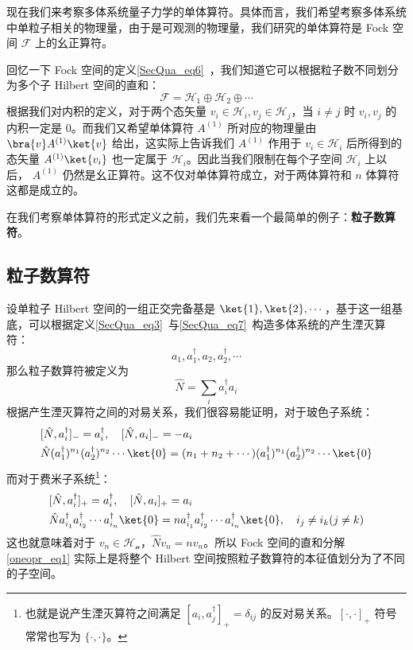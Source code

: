 

现在我们来考察多体系统量子力学的单体算符。具体而言，我们希望考察多体系统中单粒子相关的物理量，由于是可观测的物理量，我们研究的单体算符是 Fock 空间 $\mathcal{F}$ 上的幺正算符。

回忆一下 Fock 空间的定义\autoref{SecQua_eq6}~，我们知道它可以根据粒子数不同划分为多个子 Hilbert 空间的直和：
\begin{equation}\label{oneopr_eq1}
\mathcal{F}=\mathcal{H}_1\oplus \mathcal{H}_2\oplus \cdots
\end{equation}
根据我们对内积的定义，对于两个态矢量 $v_i\in \mathcal{H}_i, v_j\in \mathcal{H}_j$，当 $i\neq j$ 时 $v_i,v_j$ 的内积一定是 $0$。而我们又希望单体算符 $A^{(1)}$ 所对应的物理量由 $\bra{v}A^{(1)} \ket{v}$ 给出，这实际上告诉我们 $A^{(1)}$ 作用于 $v_i\in \mathcal{H}_i$ 后所得到的态矢量 $A^{(1)} \ket{v_i}$ 也一定属于 $\mathcal{H}_i$。因此当我们限制在每个子空间 $\mathcal{H}_i$ 上以后， $A^{(1)}$ 仍然是幺正算符。这不仅对单体算符成立，对于两体算符和 $n$ 体算符这都是成立的。

在我们考察单体算符的形式定义之前，我们先来看一个最简单的例子：\textbf{粒子数算符}。
\subsection{粒子数算符}
设单粒子 Hilbert 空间的一组正交完备基是 $\ket{1},\ket{2},\cdots$，基于这一组基底，可以根据定义\autoref{SecQua_eq3}~与\autoref{SecQua_eq7}~构造多体系统的产生湮灭算符：
\begin{equation}
a_1,a^\dagger_1,a_2,a^\dagger_2,\cdots
\end{equation}
那么粒子数算符被定义为
\begin{equation}\label{oneopr_eq2}
\hat N=\sum_i a_i^\dagger a_i
\end{equation}
根据产生湮灭算符之间的对易关系，我们很容易能证明，对于玻色子系统：
\begin{equation}
\begin{aligned}
&[\hat N,a_i^\dagger]_-=a_i^\dagger,\quad [\hat N,a_i]_-=-a_i\\
&\hat N (a_1^\dagger)^{n_1} (a_2^\dagger)^{n_2}\cdots \ket{0} = (n_1+n_2+\cdots)   (a_1^\dagger)^{n_1} (a_2^\dagger)^{n_2}\cdots \ket{0} 
\end{aligned}
\end{equation}
而对于费米子系统\footnote{也就是说产生湮灭算符之间满足 $[a_i,a_j^\dagger]_+=\delta_{ij}$ 的反对易关系。$[\cdot,\cdot]_+$ 符号常常也写为 $\{\cdot,\cdot\}$。}：
\begin{equation}
\begin{aligned}
&[\hat N,a_i^\dagger]_+=a_i^\dagger,\quad [\hat N,a_i]_+=a_i\\
&\hat N a_{i_1}^\dagger a_{i_2}^\dagger \cdots a_{i_n}^\dagger \ket{0}= n a_{i_1}^\dagger a_{i_2}^\dagger \cdots a_{i_n}^\dagger \ket{0},\quad i_j\neq i_k(j\neq k)
\end{aligned}
\end{equation}
这也就意味着对于 $v_n\in \mathcal{H_n}$，$\hat N v_n=n v_n$。所以 Fock 空间的直和分解 \autoref{oneopr_eq1} 实际上是将整个 Hilbert 空间按照粒子数算符的本征值划分为了不同的子空间。


